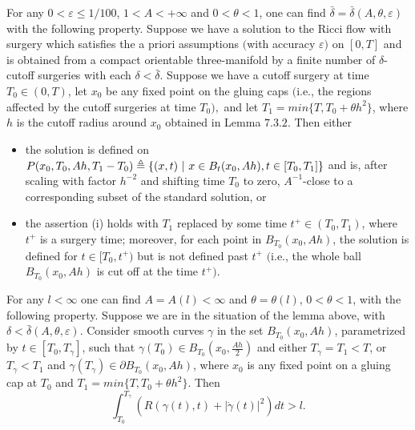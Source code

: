 \begin{lemma}
  \label{lem:cz-surgery-stability-near-standard-cap}

For any $0<\varepsilon \leq 1/100$, $1<A<+\infty$ and
$0<\theta<1$, one can find
$\bar{\delta}=\bar{\delta}(A,\theta,\varepsilon)$ with the
following property. Suppose we have a solution to the Ricci flow
with surgery which satisfies the a priori assumptions $($with
accuracy $\varepsilon)$ on $[0,T]$ and is obtained from a compact
orientable three-manifold by a finite number of $\delta$-cutoff
surgeries with each $\delta<\bar{\delta}$. Suppose we have a
cutoff surgery at time $T_0\in(0,T)$, let $x_0$ be any fixed point
on the gluing caps $($i.e., the regions affected by the cutoff
surgeries at time $T_0),$ and let $T_1=min\{T,T_0+\theta h^2\}$,
where $h$ is the cutoff radius around $x_0$ obtained in Lemma
$7.3.2.$ Then either
\begin{itemize}
\item[(i)] the solution is defined on
$P(x_0,T_0,Ah,T_1-T_0)\triangleq\{(x,t)\ |\ x\in B_t(x_0,Ah),\\
 t\in[T_0,T_1]\}$ and is, after scaling with factor $h^{-2}$ and
shifting time $T_0$ to zero, $A^{-1}$-close to a corresponding
subset of the standard solution, or \item[(ii)] the assertion (i)
holds with $T_1$ replaced by some time $t^+\in(T_0,T_1)$, where
$t^+$ is a surgery time; moreover, for each point in
$B_{T_0}(x_0,Ah)$, the solution is defined for $t\in[T_0,t^+)$ but
is not defined past $t^+$ $($i.e., the whole ball
$B_{T_0}(x_0,Ah)$ is cut off at the time $t^+).$
\end{itemize}
\end{lemma}
\begin{corollary}
  \label{cor:cz-surgery-cap-curves-large-reduced-length}

For any $l<\infty$ one can find $A=A(l)<\infty$ and
$\theta=\theta(l)$, $0<\theta<1$, with the following property.
Suppose we are in the situation of the lemma above, with
$\delta<\bar{\delta}(A,\theta,\varepsilon)$. Consider smooth
curves $\gamma$ in the set $B_{T_0}(x_0,Ah)$, parametrized by
$t\in[T_0,T_{\gamma}]$, such that $\gamma(T_0)\in
B_{T_0}(x_0,\frac{Ah}{2})$ and either $T_{\gamma}=T_1<T$, or
$T_{\gamma}<T_1$ and $\gamma(T_{\gamma})\in \partial
B_{T_0}(x_0,Ah)$, where $x_0$ is any fixed point on a gluing cap
at $T_0$ and $T_1=min\{T,T_0+\theta h^2\}$. Then
$$
\int^{T_{\gamma}}_{T_0}(R(\gamma(t),t)+|\dot{\gamma}(t)|^2)dt>l.
$$
\end{corollary}
